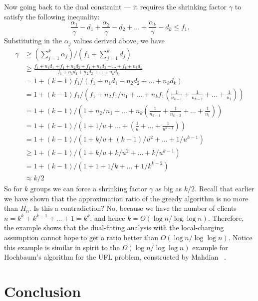 \documentclass[oneside,final]{ucr}
\begin{document}
Now going back to the dual constraint --- it requires the
shrinking factor $\gamma$ to satisfy the following
inequality:
\begin{equation}
  \frac{\alpha_1}{\gamma} - d_1 + \frac{\alpha_2}{\gamma} - d_2 +
  \ldots + \frac{\alpha_k}{\gamma} - d_k \leq f_1.
\end{equation}
Substituting in the $\alpha_j$ values derived above, we have
\begin{align*}
  \gamma &\geq (\sum_{j=1}^k \alpha_j) / (f_1 + \sum_{j=1}^k d_j)\\
  &\geq \frac{f_1 + n_1 d_1 + f_1 + n_2 d_2 + f_1 + n_3 d_3 + \ldots +
    f_1 + n_k
    d_k}{f_1 + n_1 d_1 + n_2 d_2 + \ldots + n_k d_k}\\
  &= 1 + (k-1)f_1 / (f_1 + n_1 d_1 + n_2 d_2 + \ldots + n_k d_k)\\
  &= 1 + (k-1)f_1 / \left(f_1 + n_2 f_1 / n_1 + \ldots + n_k f_1
    (\frac{1}{n_{k-1}} + \frac{1}{n_{k-2}} + \ldots +
    \frac{1}{n_1})\right)\\
  &= 1 + (k-1) / \left(1 + n_2 / n_1 + \ldots + n_k
    (\frac{1}{n_{k-1}} + \frac{1}{n_{k-2}} + \ldots +
    \frac{1}{n_1})\right)\\
  &= 1 + (k-1) / \left(1 + 1/u + \ldots + (\frac{1}{u} + \ldots +
    \frac{1}{u^{k-1}})\right)\\
  &= 1 + (k-1) / \left(1 + k/u + (k-1)/u^2 + \ldots +
    1/u^{k-1}\right)\\
  &\geq 1 + (k-1) / \left(1 + k/u + k/u^2 + \ldots +
    k/u^{k-1}\right)\\
  &= 1 + (k-1) / \left(1 + 1 + 1/k + \ldots + 1/k^{k-2}\right)\\
  &\approx k/2
\end{align*}
So for $k$ groups we can force a shrinking factor $\gamma$
as big as $k/2$. Recall that earlier we have shown that the
approximation ratio of the greedy algorithm is no more than
$H_n$. Is this a contradiction? No, because we have the
number of clients $n=k^k + k^{k-1} + \ldots + 1 = k^k$,
and hence $k = O(\log n / \log\log n)$. Therefore, the
example shows that the dual-fitting analysis with the
local-charging assumption cannot hope to get a ratio better
than $O(\log n / \log\log n)$. Notice this example is
similar in spirit to the $\Omega(\log n/ \log\log n)$
example for Hochbaum's algorithm for the UFL problem,
constructed by Mahdian {\etal} ~\cite{JainMMSV03}.

\chapter{Conclusion} \label{ch: conclusion} 
\end{document}
